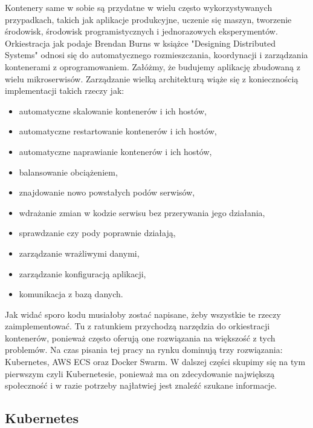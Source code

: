 Kontenery same w sobie są przydatne w wielu często wykorzystywanych przypadkach, takich jak aplikacje produkcyjne, uczenie się maszyn, tworzenie środowisk, środowisk programistycznych i jednorazowych eksperymentów. Orkiestracja jak podaje Brendan Burns w książce "Designing Distributed Systems" odnosi się do automatycznego rozmieszczania, koordynacji i zarządzania kontenerami z oprogramowaniem. Załóżmy, że budujemy aplikację zbudowaną z wielu mikroserwisów. Zarządzanie wielką architekturą wiąże się z koniecznością implementacji takich rzeczy jak:
\begin{itemize}
    \item automatyczne skalowanie kontenerów i ich hostów,
    \item automatyczne restartowanie kontenerów i ich hostów,
    \item automatyczne naprawianie kontenerów i ich hostów,
    \item balansowanie obciążeniem,
    \item znajdowanie nowo powstałych podów serwisów,
    \item wdrażanie zmian w kodzie serwisu bez przerywania jego działania, 
    \item sprawdzanie czy pody poprawnie działają,
    \item zarządzanie wrażliwymi danymi,
    \item zarządzanie konfiguracją aplikacji,
    \item komunikacja z bazą danych.
\end{itemize}
Jak widać sporo kodu musiałoby zostać napisane, żeby wszystkie te rzeczy zaimplementować. Tu z ratunkiem przychodzą narzędzia do orkiestracji kontenerów, ponieważ często oferują one rozwiązania na większość z tych problemów. Na czas pisania tej pracy na rynku dominują trzy rozwiązania: Kubernetes, AWS ECS oraz Docker Swarm. W dalszej części skupimy się na tym pierwszym czyli Kubernetesie, ponieważ ma on zdecydowanie największą społeczność i w razie potrzeby najłatwiej jest znaleźć szukane informacje.

\subsection{Kubernetes}

